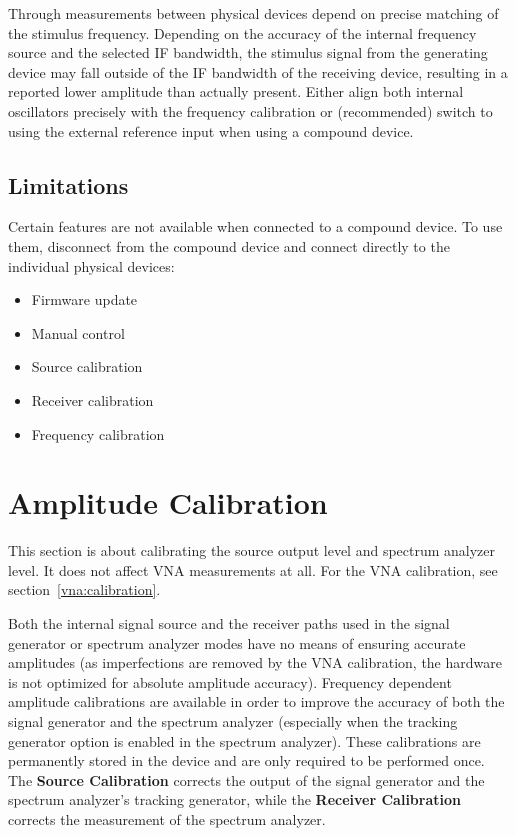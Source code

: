 \documentclass[a4paper,11pt]{article}
\newcommand\info[1][5ex]{%
  \renewcommand\stacktype{L}%
  \scaleto{\stackon[1.2pt]{\color{blue}$\bigcirc$}{\raisebox{-1.5pt}{\small i}}}{#1}%
}
\newenvironment{information}[1][]{%
   \begin{mdframed}[%
      backgroundcolor={blue!15}, hidealllines=true,
      skipabove=0.7\baselineskip, skipbelow=0.7\baselineskip,
      splitbottomskip=2pt, splittopskip=4pt, #1]%
   \makebox[0pt]{%
      \smash{%
         \hspace*{-45pt}%
         \raisebox{-5pt}{%
            {\info}%
         }%
      }%
   }%
}{\end{mdframed}}
\begin{document}
\begin{information}
Through measurements between physical devices depend on precise matching of the stimulus frequency. Depending on the accuracy of the internal frequency source and the selected IF bandwidth, the stimulus signal from the generating device may fall outside of the IF bandwidth of the receiving device, resulting in a reported lower amplitude than actually present. Either align both internal oscillators precisely with the frequency calibration or (recommended) switch to using the external reference input when using a compound device.
\end{information}

\subsection{Limitations}
Certain features are not available when connected to a compound device. To use them, disconnect from the compound device and connect directly to the individual physical devices:
\begin{itemize}
\item Firmware update
\item Manual control
\item Source calibration
\item Receiver calibration
\item Frequency calibration
\end{itemize}


\section{Amplitude Calibration}
\label{amplitude:calibration}
This section is about calibrating the source output level and spectrum analyzer level. It does not affect VNA measurements at all. For the VNA calibration, see section~\ref{vna:calibration}.

Both the internal signal source and the receiver paths used in the signal generator or spectrum analyzer modes have no means of ensuring accurate amplitudes (as imperfections are removed by the VNA calibration, the hardware is not optimized for absolute amplitude accuracy). Frequency dependent amplitude calibrations are available in order to improve the accuracy of both the signal generator and the spectrum analyzer (especially when the tracking generator option is enabled in the spectrum analyzer). These calibrations are permanently stored in the device and are only required to be performed once. The \textbf{Source Calibration} corrects the output of the signal generator and the spectrum analyzer's tracking generator, while the \textbf{Receiver Calibration} corrects the measurement of the spectrum analyzer.
\end{document}
